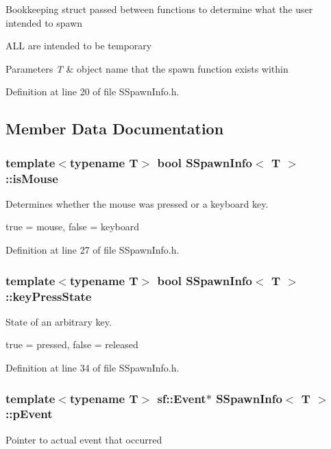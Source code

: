 Bookkeeping struct passed between functions to determine what the user intended to spawn

A\-L\-L are intended to be temporary 
\begin{DoxyParams}{Parameters}
{\em T} & object name that the spawn function exists within \\
\hline
\end{DoxyParams}


Definition at line 20 of file S\-Spawn\-Info.\-h.



\subsection{Member Data Documentation}
\hypertarget{structSSpawnInfo_ac7031f22395eeabeaa0fd70106a6240d}{
\subsubsection[{is\-Mouse}]{\setlength{\rightskip}{0pt plus 5cm}template$<$typename T$>$ bool {\bf S\-Spawn\-Info}$<$ T $>$\-::is\-Mouse}}\label{structSSpawnInfo_ac7031f22395eeabeaa0fd70106a6240d}
Determines whether the mouse was pressed or a keyboard key.

true = mouse, false = keyboard 

Definition at line 27 of file S\-Spawn\-Info.\-h.

\hypertarget{structSSpawnInfo_a170d2aab04fc1f6f8d47214f669c7fa8}{
\subsubsection[{key\-Press\-State}]{\setlength{\rightskip}{0pt plus 5cm}template$<$typename T$>$ bool {\bf S\-Spawn\-Info}$<$ T $>$\-::key\-Press\-State}}\label{structSSpawnInfo_a170d2aab04fc1f6f8d47214f669c7fa8}
State of an arbitrary key.

true = pressed, false = released 

Definition at line 34 of file S\-Spawn\-Info.\-h.

\hypertarget{structSSpawnInfo_a2049a025aa48f908865cb50a6e36555f}{
\subsubsection[{p\-Event}]{\setlength{\rightskip}{0pt plus 5cm}template$<$typename T$>$ {\bf sf\-::\-Event}$\ast$ {\bf S\-Spawn\-Info}$<$ T $>$\-::p\-Event}}\label{structSSpawnInfo_a2049a025aa48f908865cb50a6e36555f}
Pointer to actual event that occurred 

